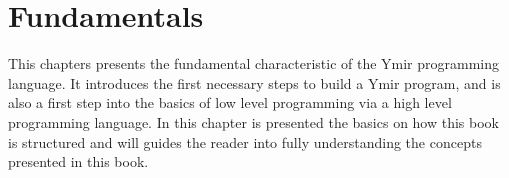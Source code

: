 \chapter{Fundamentals}
This chapters presents the fundamental characteristic of the Ymir programming
language. It introduces the first necessary steps to build a Ymir program, and
is also a first step into the basics of low level programming via a high level
programming language. In this chapter is presented the basics on how this book
is structured and will guides the reader into fully understanding the concepts
presented in this book.

\begin{multicols*}{2}
  \minitoc%
  
\end{multicols*}
